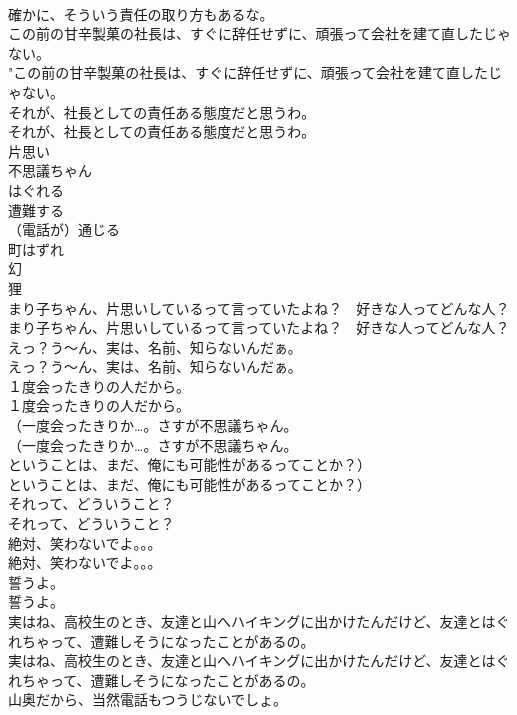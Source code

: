\documentclass[8pt]{extreport}
\begin{document}
\begin{CJK}{UTF8}{min}
\\	確かに、そういう責任の取り方もあるな。 
\\	この前の甘辛製菓の社長は、すぐに辞任せずに、頑張って会社を建て直したじゃない。	
\\	"この前の甘辛製菓の社長は、すぐに辞任せずに、頑張って会社を建て直したじゃない。 
\\	それが、社長としての責任ある態度だと思うわ。	
\\	それが、社長としての責任ある態度だと思うわ。 
\\	片思い
\\	不思議ちゃん
\\	はぐれる
\\	遭難する
\\	（電話が）通じる
\\	町はずれ
\\	幻
\\	狸
\\	まり子ちゃん、片思いしているって言っていたよね？　好きな人ってどんな人？	
\\	まり子ちゃん、片思いしているって言っていたよね？　好きな人ってどんな人？ 
\\	えっ？う～ん、実は、名前、知らないんだぁ。	
\\	えっ？う～ん、実は、名前、知らないんだぁ。 
\\	１度会ったきりの人だから。	
\\	１度会ったきりの人だから。 
\\	（一度会ったきりか…。さすが不思議ちゃん。	
\\	（一度会ったきりか…。さすが不思議ちゃん。 
\\	ということは、まだ、俺にも可能性があるってことか？）	
\\	ということは、まだ、俺にも可能性があるってことか？） 
\\	それって、どういうこと？	
\\	それって、どういうこと？ 
\\	絶対、笑わないでよ。。。	
\\	絶対、笑わないでよ。。。 
\\	誓うよ。	
\\	誓うよ。 
\\	実はね、高校生のとき、友達と山へハイキングに出かけたんだけど、友達とはぐれちゃって、遭難しそうになったことがあるの。	
\\	実はね、高校生のとき、友達と山へハイキングに出かけたんだけど、友達とはぐれちゃって、遭難しそうになったことがあるの。 
\\	山奥だから、当然電話もつうじないでしょ。	

\end{CJK}
\end{document}
